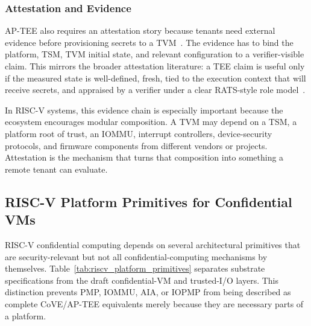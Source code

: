 \subsubsection{Attestation and Evidence}

AP-TEE also requires an attestation story because tenants need external
evidence before provisioning secrets to a TVM~\cite{riscv_ap_tee_2024}. The
evidence has to bind the platform, TSM, TVM initial state, and relevant
configuration to a verifier-visible claim. This mirrors the broader attestation
literature: a TEE claim is useful only if the measured state is well-defined,
fresh, tied to the execution context that will receive secrets, and appraised by
a verifier under a clear RATS-style role model~\cite{rats_rfc,eat_rfc,menetrey2022attestation}.

In RISC-V systems, this evidence chain is especially important because the
ecosystem encourages modular composition. A TVM may depend on a TSM, a platform
root of trust, an IOMMU, interrupt controllers, device-security protocols, and
firmware components from different vendors or projects. Attestation is the
mechanism that turns that composition into something a remote tenant can
evaluate.

\subsection{RISC-V Platform Primitives for Confidential VMs}

RISC-V confidential computing depends on several architectural primitives that
are security-relevant but not all confidential-computing mechanisms by
themselves. Table~\ref{tab:riscv_platform_primitives} separates substrate
specifications from the draft confidential-VM and trusted-I/O layers. This
distinction prevents PMP, IOMMU, AIA, or IOPMP from being described as complete
CoVE/AP-TEE equivalents merely because they are necessary parts of a platform.

